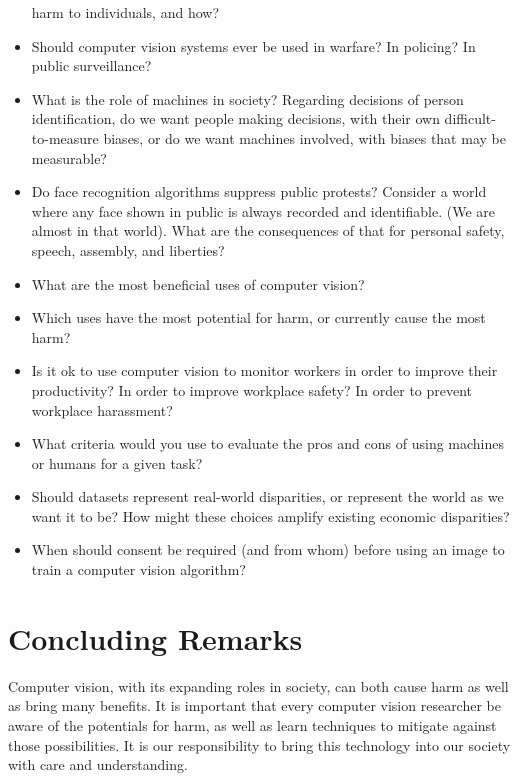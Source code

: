 \begin{itemize}
        harm to individuals, and how?
  \item Should computer vision systems ever be used in warfare? In policing? In
        public surveillance?
  \item What is the role of machines in society?  Regarding decisions of person identification,
        do we want people making decisions, with their own difficult-to-measure biases, or do we want machines involved,  with biases that may be measurable?
  \item Do face recognition algorithms suppress public protests?  Consider a world where any face shown in public is always recorded and identifiable.  (We are almost in that world).  What are the consequences of that for personal safety, speech, assembly, and liberties?
  \item What are the most beneficial uses of computer vision?
  \item Which uses have the most potential for harm, or currently cause the most harm?
  \item Is it ok to use computer vision to monitor workers in order to improve their productivity?  In order to improve workplace safety?  In order to prevent workplace harassment?
  \item What criteria would you use to evaluate the pros and cons of using machines or humans for a given task?
  \item Should datasets represent real-world disparities, or represent the world as we want it to be?  How might these choices amplify existing economic disparities?
  \item When should consent be required (and from whom) before using an image to train a computer vision algorithm?
\end{itemize}

\section{Concluding Remarks}

Computer vision, with its expanding roles in society, can both cause harm as well as bring many benefits.  It is important that every computer vision researcher be aware of the potentials for harm, as well as learn techniques to mitigate against those possibilities.  It is our responsibility to bring this technology into our society with care and understanding.






